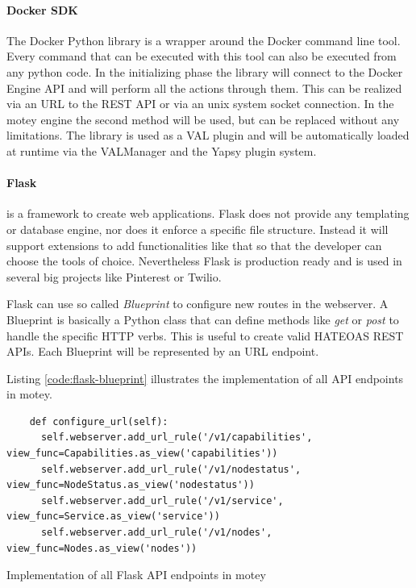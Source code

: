 \paragraph{Docker \ac{SDK}}
The Docker Python library is a wrapper around the Docker command line tool.
Every command that can be executed with this tool can also be executed from any python code.
In the initializing phase the library will connect to the Docker Engine \ac{API} and will perform all the actions through them.
This can be realized via an \ac{URL} to the \ac{REST} \ac{API} or via an unix system socket connection.
In the motey engine the second method will be used, but can be replaced without any limitations.
The library is used as a \ac{VAL} plugin and will be automatically loaded at runtime via the VALManager and the Yapsy plugin system.

\paragraph{Flask} is a framework to create web applications.
Flask does not provide any templating or database engine, nor does it enforce a specific file structure.
Instead it will support extensions to add functionalities like that so that the developer can choose the tools of choice.\autocite[cf.]{Flask:Documentation:Foreword}
Nevertheless Flask is production ready and is used in several big projects like Pinterest\autocite{Quora:Pinterest:Flask} or Twilio\autocite{Twilio:Flask}.

Flask can use so called \textit{Blueprint} to configure new routes in the webserver.
A Blueprint is basically a Python class that can define methods like \textit{get} or \textit{post} to handle the specific \ac{HTTP} verbs.
This is useful to create valid \ac{HATEOAS} \ac{REST} \acp{API}.
Each Blueprint will be represented by an \ac{URL} endpoint.

Listing \ref{code:flask-blueprint} illustrates the implementation of all \ac{API} endpoints in motey.
\begin{listing}[H]
  \begin{verbatim}
    def configure_url(self):
      self.webserver.add_url_rule('/v1/capabilities', view_func=Capabilities.as_view('capabilities'))
      self.webserver.add_url_rule('/v1/nodestatus', view_func=NodeStatus.as_view('nodestatus'))
      self.webserver.add_url_rule('/v1/service', view_func=Service.as_view('service'))
      self.webserver.add_url_rule('/v1/nodes', view_func=Nodes.as_view('nodes'))
  \end{verbatim}
  \caption{Implementation of all Flask \ac{API} endpoints in motey}
  \label{code:flask-blueprint}
\end{listing}


